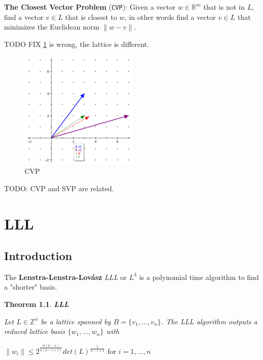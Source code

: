 \documentclass[a4paper,12pt]{report}
\newtheorem{theorem}{Theorem}[section]
\newcommand{\R}{\mathbb{R}}
\newcommand{\Z}{\mathbb{Z}}
\begin{document}
\textbf{The Closest Vector Problem} (\texttt{CVP}): Given a vector $w \in \R^m$ that is not in $L$, find a vector $v \in L$ that is closest to $w$,
in other words find a vector $v \in L$ that minimizes the Euclidean norm $\lVert w - v \rVert$.

TODO FIX \ref{fig:cvp} is wrong, the lattice is different.

\begin{figure}[t]
    \centering
    \includegraphics[width=0.5\textwidth]{./img/cvp.png}
    \caption{CVP}
    \label{fig:cvp}
\end{figure}

TODO: CVP and SVP are related.

\chapter{LLL}

\section{Introduction}

The \textbf{Lenstra-Lenstra-Lovász} \textit{LLL} or \textit{$L^3$} is a polynomial time algorithm to find a "shorter" basis.

\begin{theorem}
    \textbf{LLL}
\end{theorem}

\textit{Let $L \in \Z^n$ be a lattice spanned by $B = \{v_1,\ldots,v_n\}$. The LLL algorithm outputs a reduced lattice
basis $\{w_1, \ldots, w_n\}$ with}

\begin{center}
    $\lVert w_i \rVert \le 2^{\frac{n(n-1)}{4(n-i+1)}} det(L)^{\frac{1}{n-i+1}}$ for $i=1,\ldots,n$
\end{center}
\end{document}
